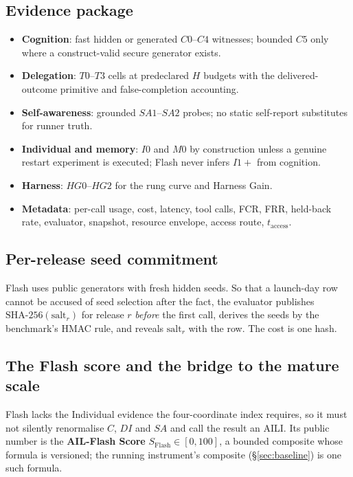 \subsection{Evidence package}
\begin{itemize}[itemsep=1pt]
\item \textbf{Cognition}: fast hidden or generated $C0$--$C4$ witnesses; bounded $C5$ only where a construct-valid secure generator exists.
\item \textbf{Delegation}: $T0$--$T3$ cells at predeclared $H$ budgets with the delivered-outcome primitive and false-completion accounting.
\item \textbf{Self-awareness}: grounded $SA1$--$SA2$ probes; no static self-report substitutes for runner truth.
\item \textbf{Individual and memory}: $I0$ and $M0$ by construction unless a genuine restart experiment is executed; Flash never infers $I1{+}$ from cognition.
\item \textbf{Harness}: $HG0$--$HG2$ for the rung curve and Harness Gain.
\item \textbf{Metadata}: per-call usage, cost, latency, tool calls, FCR, FRR, held-back rate, evaluator, snapshot, resource envelope, access route, $t_{\text{access}}$.
\end{itemize}

\subsection{Per-release seed commitment}
Flash uses public generators with fresh hidden seeds. So that a launch-day row cannot be accused of seed selection after the fact, the evaluator publishes $\mathrm{SHA\text{-}256}(\text{salt}_r)$ for release $r$ \emph{before} the first call, derives the seeds by the benchmark's HMAC rule, and reveals $\text{salt}_r$ with the row. The cost is one hash.

\subsection{The Flash score and the bridge to the mature scale}
Flash lacks the Individual evidence the four-coordinate index requires, so it must not silently renormalise $C$, $DI$ and $SA$ and call the result an AILI. Its public number is the \textbf{AIL-Flash Score} $S_{\mathrm{Flash}} \in [0, 100]$, a bounded composite whose formula is versioned; the running instrument's composite (\S\ref{sec:baseline}) is one such formula.

